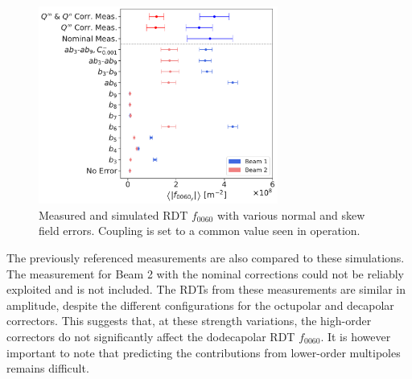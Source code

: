 \begin{figure}[!htb]
    \centering
    \includegraphics[width=0.7\textwidth]{./images/simulations_f0060.pdf}
    \caption{Measured and simulated RDT $f_{0060}$ with various normal and skew field errors.
    Coupling is set to a common value seen in operation.}
    \label{fig:high_orders:simulations_f0060}
\end{figure}

The previously referenced measurements are also compared to these simulations. The measurement for
Beam 2 with the nominal corrections could not be reliably exploited and is not included.  The RDTs
from these measurements are similar in amplitude, despite the different configurations for the
octupolar and decapolar correctors. This suggests that, at these strength variations, the high-order
correctors do not significantly affect the dodecapolar RDT $f_{0060}$. It is however important to
note that predicting the contributions from lower-order multipoles remains difficult.
